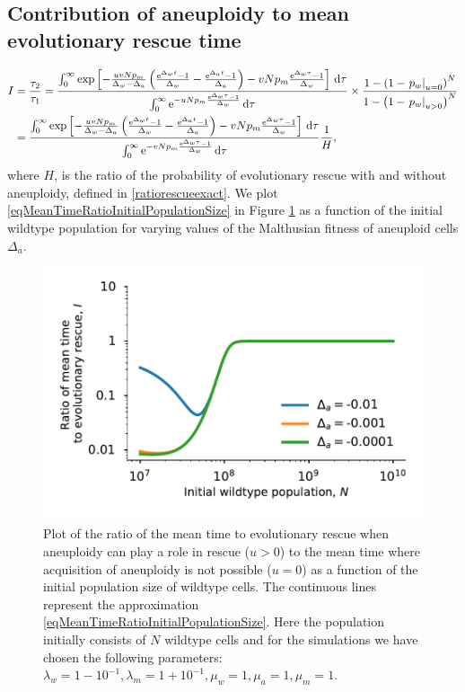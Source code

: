 \documentclass[12pt]{extarticle}
\renewcommand{\d}{{\rm d}}
\newcommand{\e}{{\rm e}}
\begin{document}
\subsection*{Contribution of aneuploidy to mean evolutionary rescue time}
\begin{align}\nonumber
I&=\frac{\tau_2}{\tau_1}=\frac{\int_0^\infty\exp\left[-\frac{uvNp_m}{\Delta_w-\Delta_a}\left(\frac{\e^{\Delta_wt}-1}{\Delta_w}-\frac{\e^{\Delta_at}-1}{\Delta_a}\right)-vNp_m\frac{\e^{\Delta_w\tau}-1}{\Delta_w}\right]\,\d\tau}{\int_0^\infty\e^{-uNp_m\frac{\e^{\Delta_w\tau}-1}{\Delta_w}}\,\d\tau}\times\frac{1-\left(1-\left.p_w\right|_{u=0}\right)^N}{1-\left(1-\left.p_w\right|_{u>0}\right)^N}\\\label{eqMeanTimeRatioInitialPopulationSize}
&=\frac{\int_0^\infty\exp\left[-\frac{uvNp_m}{\Delta_w-\Delta_a}\left(\frac{\e^{\Delta_wt}-1}{\Delta_w}-\frac{\e^{\Delta_at}-1}{\Delta_a}\right)-vNp_m\frac{\e^{\Delta_w\tau}-1}{\Delta_w}\right]\,\d\tau}{\int_0^\infty\e^{-vNp_m\frac{\e^{\Delta_w\tau}-1}{\Delta_w}}\,\d\tau}\frac{1}{H},
\end{align}
where $H$, is the ratio of the probability of evolutionary rescue with and without aneuploidy, defined in \eqref{ratiorescueexact}. We plot \eqref{eqMeanTimeRatioInitialPopulationSize} in Figure \ref{MeanTimeRatioInitialPopulationSize} as a function of the initial wildtype population for varying values of the Malthusian fitness of aneuploid cells $\Delta_a$.

\begin{figure}[!h]
 \vspace*{1\baselineskip}
\includegraphics[width=1\textwidth]{Figures/MeanTimeRatioInitialPopulationSize.pdf}
\caption{Plot of the ratio of the mean time to evolutionary rescue when aneuploidy can play a role in rescue ($u>0$) to the mean time where acquisition of aneuploidy is not possible ($u=0$) as a function of the initial population size of wildtype cells. The continuous lines represent the approximation \eqref{eqMeanTimeRatioInitialPopulationSize}.  Here the population initially consists of $N$ wildtype cells and for the simulations we have chosen the following parameters: $\lambda_w=1-10^{-1},\lambda_m=1+10^{-1},\mu_w=1,\mu_a=1,\mu_m=1$.}
\label{MeanTimeRatioInitialPopulationSize}
\end{figure}
\end{document}
